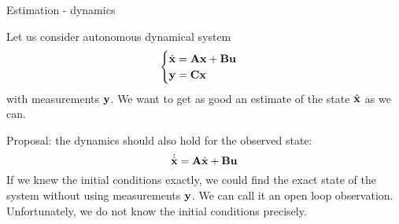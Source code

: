 \documentclass{beamer}
\begin{document}
\begin{frame}{Estimation - dynamics}
\begin{flushleft}

Let us consider autonomous dynamical system
\begin{equation}
\label{eq:LTI}
\begin{cases}
\dot {\mathbf{x}} = \mathbf{A} \mathbf{x} + \mathbf{B} \mathbf{u} \\
\mathbf{y} = \mathbf{C} \mathbf{x}
\end{cases}
\end{equation}
%
with measurements $\mathbf{y}$. We want to get as good an estimate of the state $\hat{\mathbf{x}}$ as we can.

\bigskip

Proposal: the dynamics should also hold for the observed state:
\begin{equation}
\dot{\hat{\mathbf{x}}} = \mathbf{A} \hat{\mathbf{x}} + \mathbf{B} \mathbf{u}
\end{equation}
%
If we knew the initial conditions exactly, we could find the exact state of the system without using measurements $\mathbf{y}$. We can call it an open loop observation. Unfortunately, we do not know the initial conditions precisely.


\end{flushleft}
\end{frame}
\end{document}
